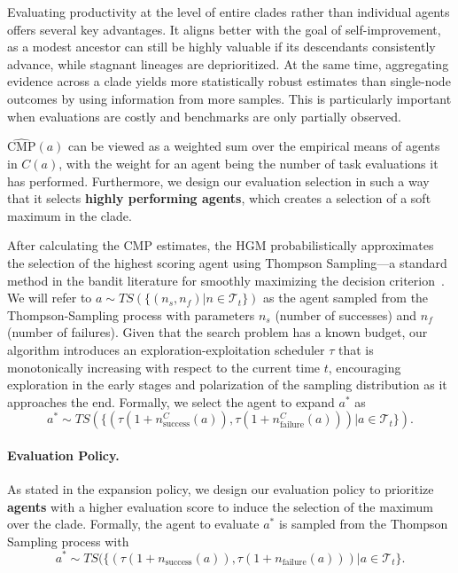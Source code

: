 \documentclass{article} %
\begin{document}
Evaluating productivity at the level of entire clades rather than individual agents offers several key advantages. It aligns better with the goal of self-improvement, as a modest ancestor can still be highly valuable if its descendants consistently advance, while stagnant lineages are deprioritized. At the same time, aggregating evidence across a clade yields more statistically robust estimates than single-node outcomes by using information from more samples. This is particularly important when evaluations are costly and benchmarks are only partially observed. 

$\widehat{\mathrm{CMP}}(a)$ can be viewed as a weighted sum over the empirical means of agents in $C(a)$, with the weight for an agent being the number of task evaluations it has performed. Furthermore, we design our evaluation selection in such a way that it selects \textbf{highly performing agents}, which creates a selection of a soft maximum in the clade. 

After calculating the $\mathrm{CMP}$ estimates, the HGM probabilistically approximates the selection of the highest scoring agent using Thompson Sampling—a standard method in the bandit literature for smoothly maximizing the decision criterion~\citep{agrawal2012analysis,chapelle2011empirical}. We will refer to $a \sim TS(\{(n_s, n_f) | n\in \mathcal{T}_t \})$ as the agent sampled from the Thompson-Sampling process with parameters $n_s$ (number of successes) and $n_f$ (number of failures).
Given that the search problem has a known budget, our algorithm introduces an exploration-exploitation scheduler $\tau$ that is monotonically increasing with respect to the current time $t$, encouraging exploration in the early stages and polarization of the sampling distribution as it approaches the end. Formally, we select the agent to expand $a^*$ as 
\[
a^* \sim TS(\{(\tau(1+n_\text{success}^C(a)), \tau(1+n_\text{failure}^C(a))) | a\in \mathcal{T}_t \}).
\]


\paragraph{Evaluation Policy.}\label{method:eval-policy}
As stated in the expansion policy, we design our evaluation policy to prioritize \textbf{agents} with a higher evaluation score to induce the selection of the maximum over the clade. Formally, the agent to evaluate $a^*$ is sampled from the Thompson Sampling process with 
\[
a^* \sim TS(\{(\tau(1+n_\text{success}(a)), \tau(1+n_\text{failure}(a)) ) | a\in \mathcal{T}_t\}.
\]
\end{document}
